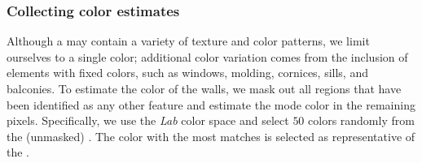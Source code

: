 \subsubsection{Collecting color estimates} 
Although a \facade may contain a variety of texture and color patterns,  we limit ourselves to a single color; additional color variation comes from the inclusion of \facade elements with fixed colors, such as windows, molding, cornices, sills, and balconies. To estimate the color of the walls, we mask out all regions that have been identified as any other feature and estimate the mode color in the remaining pixels. Specifically, we use the \textit{Lab} color space and select $50$ colors randomly from the (unmasked) \facade. The color with the most matches is selected as representative of the \facade. 






